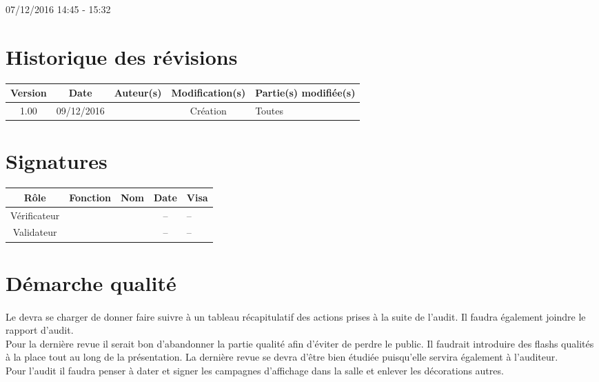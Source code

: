 \documentclass [a4paper] {article}
\begin{document}
\rhead{}

07/12/2016
\hfill   
\hfill 	14:45 - 15:32 				%



\section*{Historique des révisions}
\begin{center}
			\begin{tabular}{| c | c | c | c | p{4cm} |}
				\hline
				\rowcolor{Gray}
				Version & Date & Auteur(s) & Modification(s) & Partie(s) modifiée(s)		 \\
				\hline
				1.00 & 09/12/2016 & \Kafui & Création & Toutes \\
		\hline		
			\end{tabular}
		\end{center}

\section*{Signatures}

		\begin{center}
			\begin{tabular}{| c | c | c | c | p{4cm} |}
				\hline
				\rowcolor{Gray}
				Rôle & Fonction & Nom & Date & Visa		 \\
				\hline
				Vérificateur & \RGC & \Melissa & -- & -- \\[30pt]
				\hline
				Validateur & \CP & \Pierre & -- & -- \\[30pt]	
				\hline
			\end{tabular}
		\end{center}


\section{Démarche qualité}
\paragraph*{}
Le \RQ{} devra se charger de donner faire suivre à \nomTuteurQualite{} un tableau récapitulatif des actions prises à la suite de l'audit. Il faudra également joindre le rapport d'audit.\\
Pour la dernière revue il serait bon d'abandonner la partie qualité afin d'éviter de perdre le public. Il faudrait introduire des flashs qualités à la place tout au long de la présentation.
La dernière revue se devra d'être bien étudiée puisqu'elle servira également à l'auditeur.\\
Pour l'audit il faudra penser à dater et signer les campagnes d'affichage dans la salle et enlever les décorations autres.
\end{document}
